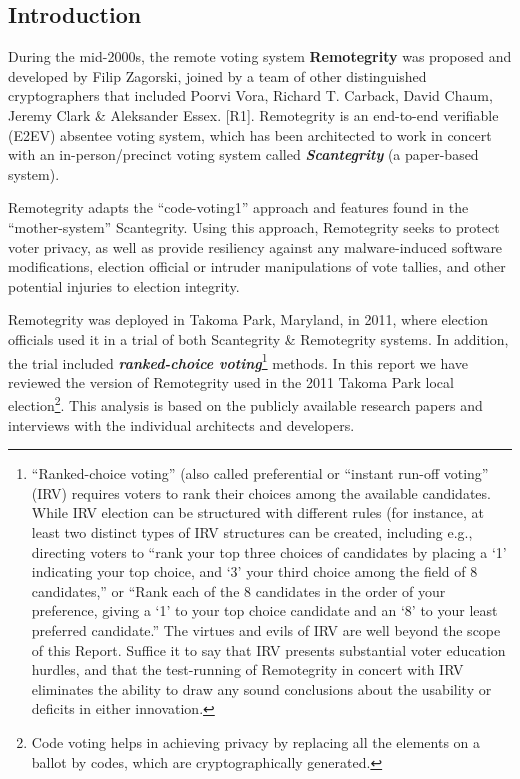 \subsection{Introduction}

During the mid-2000s, the remote voting system \textbf{Remotegrity }was proposed and developed by Filip Zagorski, joined by a team of other distinguished cryptographers that included Poorvi Vora, Richard T. Carback, David Chaum, Jeremy Clark \& Aleksander Essex. [R1]. Remotegrity is an end-to-end verifiable (E2EV) absentee voting system, which has been architected to work in concert with an in-person/precinct voting system called \textbf{\textit{Scantegrity }}(a paper-based system).

Remotegrity adapts the ``code-voting1'' approach and features found in the ``mother-system'' Scantegrity. Using this approach, Remotegrity seeks to protect voter privacy, as well as provide resiliency against any malware-induced software modifications, election official or intruder manipulations of vote tallies, and other potential injuries to election integrity.

Remotegrity was deployed in Takoma Park, Maryland, in 2011, where election officials used it in a trial of both Scantegrity \& Remotegrity systems. In addition, the trial included \textbf{\textit{ranked-choice voting}}\footnote{``Ranked-choice voting'' (also called preferential or ``instant run-off voting'' (IRV) requires voters to rank their choices among the available candidates. While IRV election can be structured with different rules (for instance, at least two distinct types of IRV structures can be created, including e.g., directing voters to ``rank your top three choices of candidates by placing a `1' indicating your top choice, and `3' your third choice among the field of 8 candidates,'' or ``Rank each of the 8 candidates in the order of your preference, giving a `1' to your top choice candidate and an `8' to your least preferred candidate.'' The virtues and evils of IRV are well beyond the scope of this Report. Suffice it to say that IRV presents substantial voter education hurdles, and that the test-running of Remotegrity in concert with IRV eliminates the ability to draw any sound conclusions about the usability or deficits in either innovation.} methods. In this report we have reviewed the version of Remotegrity used in the 2011 Takoma Park local election\footnote{Code voting helps in achieving privacy by replacing all the elements on a ballot by codes, which are cryptographically generated.}. This analysis is based on the publicly available research papers and interviews with the individual architects and developers.

